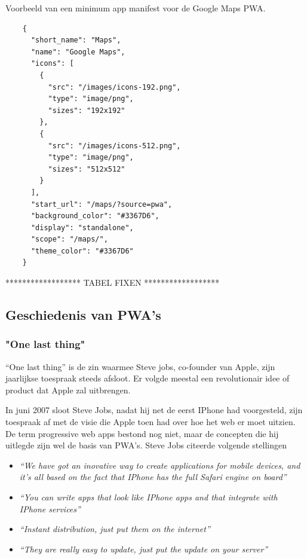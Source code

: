 	Voorbeeld van een minimum app manifest voor de Google Maps PWA.
	
	\begin{lstlisting}
	{
	  "short_name": "Maps",
	  "name": "Google Maps",
	  "icons": [
	    {
	      "src": "/images/icons-192.png",
	      "type": "image/png",
	      "sizes": "192x192"
	    },
	    {
	      "src": "/images/icons-512.png",
	      "type": "image/png",
	      "sizes": "512x512"
	    }
	  ],
	  "start_url": "/maps/?source=pwa",
	  "background_color": "#3367D6",
	  "display": "standalone",
	  "scope": "/maps/",
	  "theme_color": "#3367D6"
	}
	\end{lstlisting}
	
	
	
	
	
	
	****************** TABEL FIXEN  ******************
	
	\autocite{LePage2020}

\subsection{Geschiedenis van PWA's}

	\subsubsection{"One last thing"}
	
		 “One last thing” is de zin waarmee Steve jobs, co-founder van Apple, zijn jaarlijkse toespraak steeds afsloot. Er volgde meestal een revolutionair idee of product dat Apple zal uitbrengen.
		
		In juni 2007 sloot Steve Jobs, nadat hij net de eerst IPhone had voorgesteld, zijn toespraak af met de visie die Apple toen had over hoe het web er moet uitzien. De term progressive web apps bestond nog niet, maar de concepten die hij uitlegde zijn wel de basis van PWA’s. Steve Jobs citeerde volgende stellingen
	
		
		\begin{itemize}
			\item \textit{ “We have got an inovative way to create applications for mobile devices, and it’s all based on the fact that IPhone has the full Safari engine on board”}
			\item \textit{ “You can write apps that look like IPhone apps and that integrate with IPhone services”}
			\item \textit{ “Instant distribution, just put them on the internet”}
			\item \textit{ “They are really easy to update, just put the update on your server”}
		\end{itemize}
		
